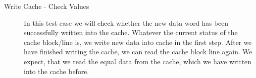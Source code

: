 \begin{description}
\item[Write Cache - Check Values] In this test case we will check whether the new data word has been successfully written into the cache. Whatever the current status of the cache block/line is, we write new data into cache in the first step. After we have finished writing the cache, we can read the cache block line again. We expect, that we read the equal data from the cache, which we have written into the cache before.

\end{description}
